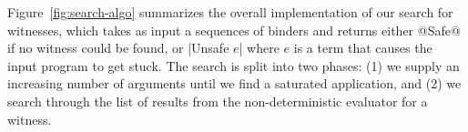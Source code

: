 %
Figure~\ref{fig:search-algo} summarizes the overall implementation of
our search for witnesses, which takes as input a sequences of binders
and returns either @Safe@ if no witness could be found, or |Unsafe $e$|
where $e$ is a term that causes the input program to get stuck.
%
The search is split into two phases: (1) we supply an increasing number
of arguments until we find a saturated application, and (2) we search
through the list of results from the non-deterministic evaluator for a
witness.


